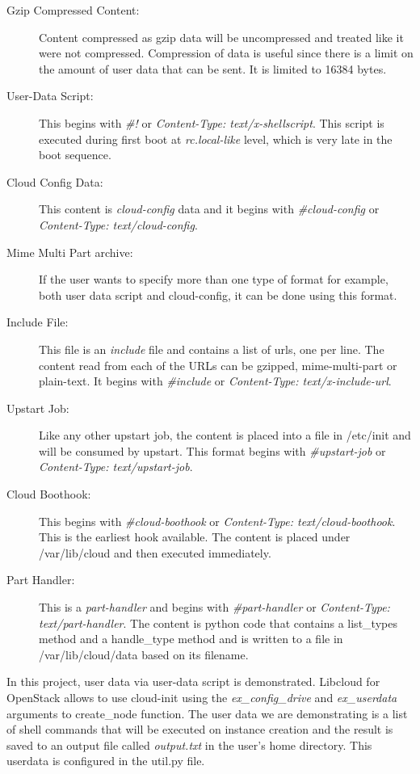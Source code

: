 \begin{description}
   \item[Gzip Compressed Content:] Content compressed as gzip data will be
   uncompressed and treated like it were not compressed. Compression of data 
   is useful since there is a limit on the amount of user data that can be 
   sent. It is limited to 16384 bytes. 
   \item[User-Data Script:] This begins with \textit{\#!} or
   \textit{Content-Type: text/x-shellscript}. This script is executed during 
   first boot at \textit{rc.local-like} level, which is very late in the boot 
   sequence. 
   \item[Cloud Config Data:] This content is \textit{cloud-config} data and it
   begins with \textit{\#cloud-config} or 
   \textit{Content-Type: text/cloud-config}. 
   \item[Mime Multi Part archive:] If the user wants to specify more than one
   type of format for example, both user data script and cloud-config, it can 
   be done using this format. 
   \item[Include File:] This file is an \textit{include} file and contains a
   list of urls, one per line. The content read from each of the URLs can be
   gzipped, mime-multi-part or plain-text. It begins with \textit{\#include} or
   \textit{Content-Type: text/x-include-url}. 
   \item[Upstart Job:] Like any other upstart job, the content is placed into a
   file in /etc/init and will be consumed by upstart. This format begins with
   \textit{\#upstart-job} or \textit{Content-Type: text/upstart-job}. 
   \item[Cloud Boothook:] This begins with \textit{\#cloud-boothook} or
   \textit{Content-Type: text/cloud-boothook}. This is the earliest hook 
   available. The content is placed under /var/lib/cloud and then executed 
   immediately. 
   \item[Part Handler:] This is a \textit{part-handler} and begins with
   \textit{\#part-handler} or \textit{Content-Type: text/part-handler}. The 
   content is python code that contains a list\_types method and a 
   handle\_type method and is written to a file in /var/lib/cloud/data 
   based on its filename. 
\end{description}

In this project, user data via user-data script is demonstrated. Libcloud for
OpenStack allows to use cloud-init using the \textit{ex\_config\_drive} and
\textit{ex\_userdata} arguments to create\_node function. The user data we are
demonstrating is a list of shell commands that will be executed on instance
creation and the result is saved to an output file called \textit{output.txt} 
in the user's home directory. This userdata is configured in the util.py file.

